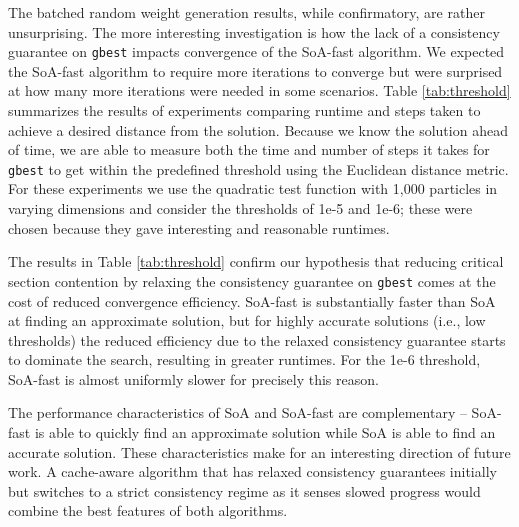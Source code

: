 The batched random weight generation results, while confirmatory, are rather
unsurprising. The more interesting investigation is how the lack of a
consistency guarantee on \texttt{gbest} impacts convergence of the SoA-fast algorithm. We
expected the SoA-fast algorithm to require more iterations to converge
but were surprised at how many more iterations were needed in some
scenarios. Table \ref{tab:threshold} summarizes the results of experiments
comparing runtime and steps taken to achieve a desired distance from the
solution. Because we know the solution ahead of time, we are able to measure
both the time and number of steps it
takes for \texttt{gbest} to get within the predefined threshold using the
Euclidean distance metric. For these experiments we use the quadratic test
function with 1,000 particles in varying dimensions and
consider the thresholds of 1e-5 and 1e-6; these were chosen because they
gave interesting and reasonable runtimes.

The results in Table \ref{tab:threshold} confirm our hypothesis that
reducing critical section contention by relaxing the consistency
guarantee on \texttt{gbest} comes at the cost of reduced convergence efficiency. SoA-fast is
substantially faster than SoA at finding an approximate solution, but for highly
accurate solutions (i.e., low thresholds) the reduced efficiency due to the
relaxed consistency guarantee starts to dominate the search, resulting in
greater runtimes. For the 1e-6 threshold, SoA-fast is almost
uniformly slower for precisely this reason.

The performance characteristics of SoA and SoA-fast are complementary --
SoA-fast is able to quickly find an approximate solution while SoA is able to
find an accurate solution. These characteristics make for an interesting
direction of  future work. A cache-aware algorithm that has relaxed
consistency guarantees initially but switches to a strict consistency regime as
it senses slowed progress would combine the best features of both algorithms.



